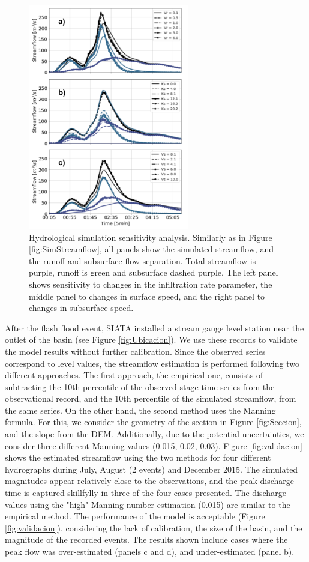 \documentclass[hess, manuscript]{copernicus}
\begin{document}
\begin{figure}[t]
\centering
 \includegraphics[width=7cm]{Figures/Parameter_variation_analysis.png}
 \caption{Hydrological simulation sensitivity analysis. Similarly as in Figure \ref{fig:SimStreamflow}, all panels show the simulated streamflow, and the runoff and subsurface flow separation. Total streamflow is purple, runoff is green and subsurface dashed purple. The left panel shows sensitivity to changes in the infiltration rate  parameter, the middle panel to changes in surface speed, and the right panel to changes in subsurface speed.}
    \label{fig:SimStreamflowSA}
\end{figure}

After the flash flood event, SIATA installed a stream gauge level station near the outlet of the basin (see Figure \ref{fig:Ubicacion}).  We use these records to validate the model results without further calibration. Since the observed series correspond to level values, the streamflow estimation is performed following two different approaches. The first approach, the empirical one, consists of subtracting the 10th percentile of the observed stage time series from the observational record, and the 10th percentile of the simulated streamflow, from the same series.  On the other hand, the second method uses the Manning formula.  For this, we consider the geometry of the section in Figure \ref{fig:Seccion}, and the slope from the DEM.  Additionally, due to the potential uncertainties, we consider three different Manning values (0.015, 0.02, 0.03). Figure \ref{fig:validacion} shows the estimated streamflow using the two methods for four different hydrographs during July, August (2 events) and December 2015. The simulated magnitudes appear relatively close to the observations, and the peak discharge time is captured skillfylly in three of the four cases presented. The discharge values using the "high" Manning number estimation (0.015) are similar to the empirical method. The performance of the model is acceptable (Figure \ref{fig:validacion}), considering the lack of calibration, the size of the basin, and the magnitude of the recorded events.  The results shown include cases where the peak flow was over-estimated (panels c and d), and  under-estimated (panel b).
\end{document}
